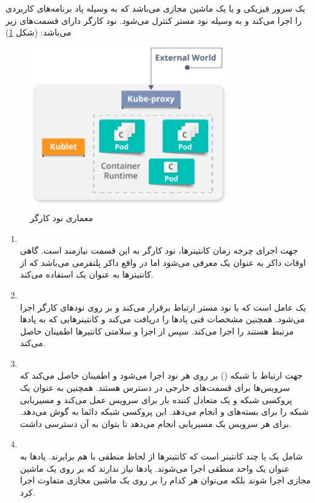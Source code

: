 یک سرور فیزیکی و یا یک ماشین مجازی می‌باشد که به وسیله پاد برنامه‌های کاربردی را اجرا می‌کند و به وسیله نود مستر کنترل می‌شود.  نود کارگر دارای قسمت‌های زیر می‌باشد: (شکل \ref{تصویر 2-12})

\begin{figure}[!h]
	\centering
	\includegraphics[height=7cm]{images/worker-node}
	\caption{ معماری نود کارگر}
	\label{تصویر 2-12}
\end{figure}

\begin{enumerate}
	\item
	\\
	جهت اجرای چرخه زمان کانتینرها، نود کارگر به این قسمت نیازمند است. گاهی اوقات داکر به عنوان یک 	معرفی می‌شود اما در واقع داکر پلتفرمی می‌باشد که از کانتینرها به عنوان یک 	استفاده می‌کند. 
	
	\item
	\\
	یک عامل است که با نود مستر ارتباط برقرار می‌کند و بر روی نودهای کارگر اجرا می‌شود. همچنین مشخصات فنی پادها را دریافت می‌کند و کانتینرهایی که به پادها مرتبط هستند را اجرا می‌کند. سپس از اجرا و سلامتی کانتیرها اطمینان حاصل می‌کند.
	\item
	\\
	جهت ارتباط با شبکه () بر روی هر نود اجرا می‌شود و اطمینان حاصل می‌کند که سرویس‌ها برای قسمت‌های خارجی در دسترس هستند. همچنین به عنوان یک پروکسی شبکه و یک  متعادل کننده بار برای سرویس عمل می‌کند و مسیریابی شبکه را برای بسته‌های  و  انجام می‌دهد. این پروکسی شبکه دائما به  گوش می‌دهد. برای هر سرویس یک مسیریابی انجام می‌دهد تا بتوان به آن دسترسی داشت.
	\item
	\\
	شامل یک یا چند کانتینر است که کانتینرها از لحاظ منطقی با هم برابرند. پادها به عنوان یک واحد منطقی اجرا می‌شوند. پادها نیاز ندارند که بر روی یک ماشین مجازی اجرا شوند بلکه می‌توان هر کدام را بر روی یک ماشین مجازی متفاوت اجرا کرد. 
\end{enumerate}


